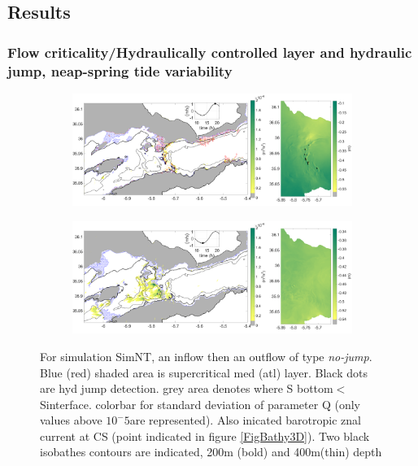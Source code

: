 \subsection{Results}
\label{section3DRes}

\subsubsection{Flow criticality/Hydraulically controlled layer and hydraulic jump, neap-spring tide variability}


\begin{figure}[!h]
 \centering
 
 \begin{subfigure}{\linewidth}
\centering
\includegraphics[width=1\linewidth]{./GBR3D/ME2_19h_p.png}
\end{subfigure}
 
 \begin{subfigure}{\linewidth}
\centering
\includegraphics[width=\linewidth]{./GBR3D/ME2_13h_p.png}
\end{subfigure}
\caption {For simulation SimNT, an inflow then an outflow of type \textit{no-jump}. Blue (red) shaded area is supercritical med (atl) layer. Black dots are hyd jump detection. grey area denotes where S bottom$<$Sinterface. colorbar for standard deviation of parameter Q (only values above $10^-5$are represented). Also inicated barotropic znal current at CS (point indicated in figure \ref{FigBathy3D}). Two black isobathes contours are indicated, 200m (bold) and 400m(thin) depth  }
\label{FigHCN}
\end{figure}

